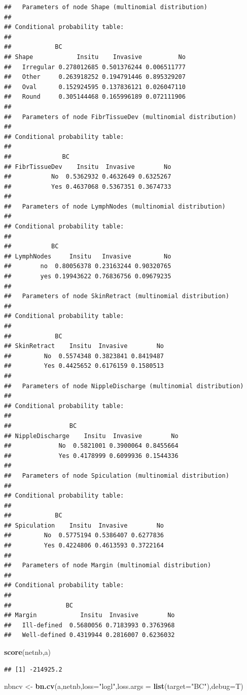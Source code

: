 \documentclass[]{article}
\newenvironment{Shaded}{\begin{snugshade}}{\end{snugshade}}
\newcommand{\KeywordTok}[1]{\textcolor[rgb]{0.13,0.29,0.53}{\textbf{{#1}}}}
\newcommand{\DataTypeTok}[1]{\textcolor[rgb]{0.13,0.29,0.53}{{#1}}}
\newcommand{\StringTok}[1]{\textcolor[rgb]{0.31,0.60,0.02}{{#1}}}
\newcommand{\NormalTok}[1]{{#1}}
\begin{document}
\begin{verbatim}
##   Parameters of node Shape (multinomial distribution)
## 
## Conditional probability table:
##  
##            BC
## Shape            Insitu    Invasive          No
##   Irregular 0.278012685 0.501376244 0.006511777
##   Other     0.263918252 0.194791446 0.895329207
##   Oval      0.152924595 0.137836121 0.026047110
##   Round     0.305144468 0.165996189 0.072111906
## 
##   Parameters of node FibrTissueDev (multinomial distribution)
## 
## Conditional probability table:
##  
##              BC
## FibrTissueDev    Insitu  Invasive        No
##           No  0.5362932 0.4632649 0.6325267
##           Yes 0.4637068 0.5367351 0.3674733
## 
##   Parameters of node LymphNodes (multinomial distribution)
## 
## Conditional probability table:
##  
##           BC
## LymphNodes     Insitu   Invasive         No
##        no  0.80056378 0.23163244 0.90320765
##        yes 0.19943622 0.76836756 0.09679235
## 
##   Parameters of node SkinRetract (multinomial distribution)
## 
## Conditional probability table:
##  
##            BC
## SkinRetract    Insitu  Invasive        No
##         No  0.5574348 0.3823841 0.8419487
##         Yes 0.4425652 0.6176159 0.1580513
## 
##   Parameters of node NippleDischarge (multinomial distribution)
## 
## Conditional probability table:
##  
##                BC
## NippleDischarge    Insitu  Invasive        No
##             No  0.5821001 0.3900064 0.8455664
##             Yes 0.4178999 0.6099936 0.1544336
## 
##   Parameters of node Spiculation (multinomial distribution)
## 
## Conditional probability table:
##  
##            BC
## Spiculation    Insitu  Invasive        No
##         No  0.5775194 0.5386407 0.6277836
##         Yes 0.4224806 0.4613593 0.3722164
## 
##   Parameters of node Margin (multinomial distribution)
## 
## Conditional probability table:
##  
##               BC
## Margin            Insitu  Invasive        No
##   Ill-defined  0.5680056 0.7183993 0.3763968
##   Well-defined 0.4319944 0.2816007 0.6236032
\end{verbatim}

\begin{Shaded}
\begin{Highlighting}[]
\KeywordTok{score}\NormalTok{(netnb,a)}
\end{Highlighting}
\end{Shaded}

\begin{verbatim}
## [1] -214925.2
\end{verbatim}

\begin{Shaded}
\begin{Highlighting}[]
\NormalTok{nbncv <-}\StringTok{ }\KeywordTok{bn.cv}\NormalTok{(a,netnb,}\DataTypeTok{loss=}\StringTok{"logl"}\NormalTok{,}\DataTypeTok{loss.args =} \KeywordTok{list}\NormalTok{(}\DataTypeTok{target=}\StringTok{"BC"}\NormalTok{),}\DataTypeTok{debug=}\NormalTok{T)}
\end{Highlighting}
\end{Shaded}
\end{document}
